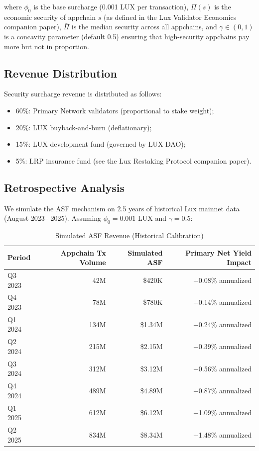 where $\phi_0$ is the base surcharge (0.001 LUX per transaction), $\Pi(s)$ is the economic
security of appchain $s$ (as defined in the Lux Validator Economics companion paper), $\bar{\Pi}$ is the median
security across all appchains, and $\gamma \in (0,1)$ is a concavity parameter (default 0.5)
ensuring that high-security appchains pay more but not in proportion.

\subsection{Revenue Distribution}

Security surcharge revenue is distributed as follows:

\begin{itemize}[leftmargin=1.5em]
  \item 60\%: Primary Network validators (proportional to stake weight);
  \item 20\%: LUX buyback-and-burn (deflationary);
  \item 15\%: LUX development fund (governed by LUX DAO);
  \item 5\%: LRP insurance fund (see the Lux Restaking Protocol companion paper).
\end{itemize}

\subsection{Retrospective Analysis}

We simulate the ASF mechanism on 2.5 years of historical Lux mainnet data (August 2023--
2025). Assuming $\phi_0 = 0.001$ LUX and $\gamma = 0.5$:

\begin{table}[H]
\centering
\caption{Simulated ASF Revenue (Historical Calibration)}
\label{tab:ssf}
\begin{tabular}{lrrr}
\toprule
\textbf{Period} & \textbf{Appchain Tx Volume} & \textbf{Simulated ASF} & \textbf{Primary Net Yield Impact} \\
\midrule
Q3 2023 & 42M & \$420K & $+$0.08\% annualized \\
Q4 2023 & 78M & \$780K & $+$0.14\% annualized \\
Q1 2024 & 134M & \$1.34M & $+$0.24\% annualized \\
Q2 2024 & 215M & \$2.15M & $+$0.39\% annualized \\
Q3 2024 & 312M & \$3.12M & $+$0.56\% annualized \\
Q4 2024 & 489M & \$4.89M & $+$0.87\% annualized \\
Q1 2025 & 612M & \$6.12M & $+$1.09\% annualized \\
Q2 2025 & 834M & \$8.34M & $+$1.48\% annualized \\
\bottomrule
\end{tabular}
\end{table}

